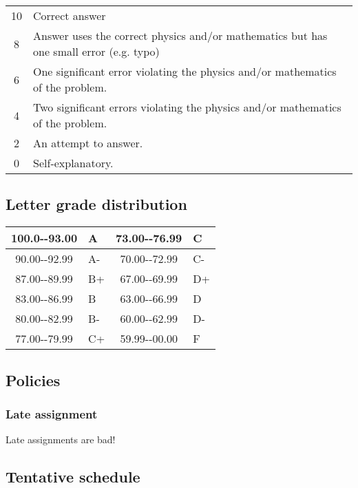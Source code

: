 \documentclass{article}%
\begin{document}
%
\begin{tabular}{|c|l|}%
\hline%
10&Correct answer\\%
8&Answer uses the correct physics and/or mathematics but has one small error (e.g. typo)\\%
6&One significant error violating the physics and/or mathematics of the problem.\\%
4&Two significant errors violating the physics and/or mathematics of the problem.\\%
2&An attempt to answer.\\%
0&Self{-}explanatory.\\%
\hline%
\end{tabular}%
\subsection*{Letter grade distribution}%
\label{subsec:Letter grade distribution}%

%
\begin{tabular}{|cl||cl|}%
\hline%
100.0{-}{-}93.00&A&73.00{-}{-}76.99&C\\%
\hline%
90.00{-}{-}92.99&A{-}&70.00{-}{-}72.99&C{-}\\%
\hline%
87.00{-}{-}89.99&B+&67.00{-}{-}69.99&D+\\%
\hline%
83.00{-}{-}86.99&B&63.00{-}{-}66.99&D\\%
\hline%
80.00{-}{-}82.99&B{-}&60.00{-}{-}62.99&D{-}\\%
\hline%
77.00{-}{-}79.99&C+&59.99{-}{-}00.00&F\\%
\hline%
\end{tabular}%
\subsection*{Policies}%
\label{subsec:Policies}%

%
\subsubsection*{Late assignment}%
\label{ssubsec:Late assignment}%

%
Late assignments are bad!%
\subsection*{Tentative schedule}%
\label{subsec:Tentative schedule}%
\end{document}
